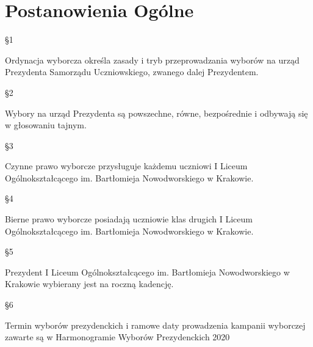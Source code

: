 \documentclass[12pt]{article}
\begin{document}
\section{Postanowienia Ogólne}
    \begin{center}
        \S 1\\
    \end{center}
    Ordynacja wyborcza określa zasady i tryb przeprowadzania wyborów na urząd Prezydenta Samorządu Uczniowskiego, zwanego dalej Prezydentem.\\
    \begin{center}
        \S 2\\
    \end{center}    
    Wybory na urząd Prezydenta są powszechne, równe, bezpośrednie i odbywają się w głosowaniu tajnym.\\
    \begin{center}
        \S 3\\
    \end{center} 
    Czynne prawo wyborcze przysługuje każdemu uczniowi I Liceum Ogólnokształcącego im. Bartłomieja Nowodworskiego w Krakowie.\\
    \begin{center}
        \S 4\\
    \end{center} 
    Bierne prawo wyborcze posiadają uczniowie klas drugich I Liceum Ogólnokształcącego im. Bartłomieja Nowodworskiego w Krakowie.\\
    \begin{center}
        \S 5\\
    \end{center} 
    Prezydent I Liceum Ogólnokształcącego im. Bartłomieja Nowodworskiego w Krakowie wybierany jest na roczną kadencję.\\
    \begin{center}
        \S 6\\
    \end{center} 
    Termin wyborów prezydenckich i ramowe daty prowadzenia kampanii wyborczej zawarte są w Harmonogramie Wyborów Prezydenckich 2020\\
\end{document}
